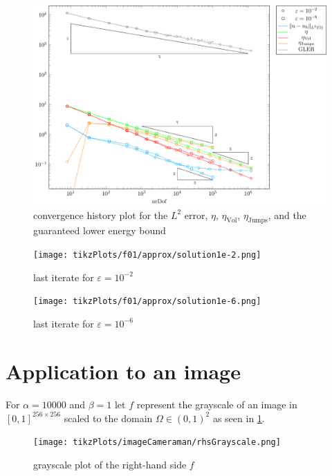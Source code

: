 \documentclass[draft=false,twoside,12pt]{scrreprt}
\begin{document}
\begin{figure}[H]
	\centering
	\includegraphics[width=14cm]{tikzPlots/f01/convergence/bothEps/fig.pdf}
  \caption{convergence history plot for the $L^2$ error, $\eta$,
  $\eta_\text{Vol}$, $\eta_\text{Jumps}$, and the guaranteed lower energy
  bound}
\end{figure}

\begin{minipage}[t]{0.45\textwidth}
  \begin{figure}[H]
	  \centering
		\texttt{[image: tikzPlots/f01/approx/solution1e-2.png]} 
    \caption{last iterate for $\varepsilon = 10^{-2}$}
  \end{figure}
\end{minipage}
\begin{minipage}[t]{0.45\textwidth}
  \begin{figure}[H]
	  \centering
		\texttt{[image: tikzPlots/f01/approx/solution1e-6.png]} 
    \caption{last iterate for $\varepsilon = 10^{-6}$}
  \end{figure}
\end{minipage}

\section{Application to an image}
For $\alpha = 10000$ and $\beta = 1$ let $f$ represent the grayscale of an 
image in $[0,1]^{256\times 256}$ scaled to the domain $\Omega\in(0,1)^2$ as
seen in \cref{fig:rhsCameraman}.

\begin{figure}[H]
	\centering
	\texttt{[image: tikzPlots/imageCameraman/rhsGrayscale.png]}
  \caption{grayscale plot of the right-hand side $f$}
  \label{fig:rhsCameraman}
\end{figure}
\end{document}
